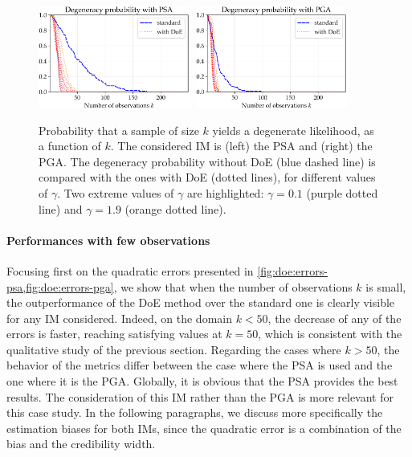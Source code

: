 \begin{figure}[h]
\centering%
\includegraphics[width=5cm]{figures/DoE/degenPSA.pdf}\ 
\includegraphics[width=5cm]{figures/DoE/degenPGA.pdf}%
\caption{Probability that a sample of size $k$ yields a degenerate likelihood, as a function of $k$. The considered IM is (left) the PSA and (right) the PGA.
The degeneracy probability without DoE (blue dashed line) is compared with the ones with DoE (dotted lines), for different values of $\gamma$. 
Two extreme values of $\gamma$ are highlighted: $\gamma=0.1$ (purple dotted line) and $\gamma=1.9$ (orange dotted line).}
\label{fig:doe:errors-degen}
\end{figure}


\paragraph{Performances with few observations} {Focusing first on the quadratic errors presented in \cref{fig:doe:errors-psa,fig:doe:errors-pga}, we show that when the number of observations $k$ is small, the outperformance of the DoE method over the standard one is clearly visible for any IM considered.}
Indeed, on the domain $k<50$, the decrease of any of the errors is faster, reaching satisfying values at $k=50$, which is consistent with the qualitative study of the previous section.
Regarding the cases where $k>50$, the behavior of the metrics differ between the case where the PSA is used and the one where it is the PGA. Globally, it is obvious that the PSA provides the best results. The consideration of this IM rather than the PGA is more relevant for this case study. {In the following paragraphs, we discuss more specifically the estimation biases for both IMs, since the quadratic error is a combination of the bias and the credibility width.}

